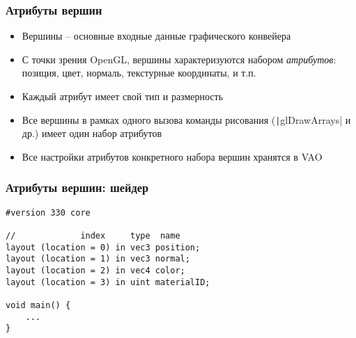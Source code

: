 \documentclass[10pt]{beamer}
\begin{document}
\begin{frame}[fragile]
\frametitle{Атрибуты вершин}
\begin{itemize}
\item Вершины -- основные входные данные графического конвейера
\pause
\item С точки зрения OpenGL, вершины характеризуются набором \textit{атрибутов}: позиция, цвет, нормаль, текстурные координаты, и т.п.
\pause
\item Каждый атрибут имеет свой тип и размерность
\pause
\item Все вершины в рамках одного вызова команды рисования (\texttt|glDrawArrays| и др.) имеет один набор атрибутов
\pause
\item Все настройки атрибутов конкретного набора вершин хранятся в VAO
\end{itemize}
\end{frame}

\begin{frame}[fragile]
\frametitle{Атрибуты вершин: шейдер}
\begin{verbatim}
#version 330 core

//             index     type  name
layout (location = 0) in vec3 position;
layout (location = 1) in vec3 normal;
layout (location = 2) in vec4 color;
layout (location = 3) in uint materialID;

void main() {
    ...
}
\end{verbatim}
\end{frame}
\end{document}
